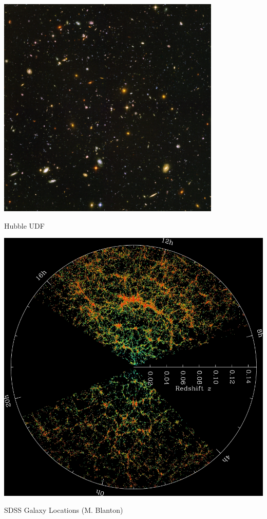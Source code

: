\documentclass{beamer}
\begin{document}
\frame
{
    \begin{center}
        \includegraphics[width=0.8\textwidth]{UDF_half.jpg}
    \end{center}
    {\normalsize Hubble UDF}
}

\frame
{
    \begin{center}
        \includegraphics[height=0.9\textheight]{orangepie.jpg}
    \end{center}
    {\normalsize SDSS Galaxy Locations (M. Blanton)}
}
\end{document}
